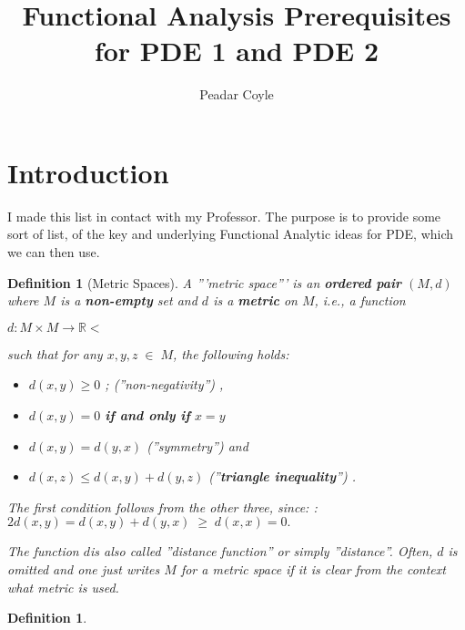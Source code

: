 \documentclass[a4paper,10pt]{article}
\title{Functional Analysis Prerequisites for PDE 1 and PDE 2}
\author{Peadar Coyle}
\theoremstyle{plain}
\newtheorem{definition}[theorem]{Definition}
\begin{document}
\maketitle
\begin{abstract}
 
\end{abstract}
\section{Introduction}
I made this list in contact with my Professor. 
The purpose is to provide some sort of list, of the key and underlying Functional Analytic ideas for PDE,
which we can then use.
\begin{definition}[Metric Spaces]
A '''metric space''' is an \textbf{ordered pair} $(M,d)$ where $M$ is a \textbf{non-empty}
 set and $d$ is a \textbf{metric} on $M$, i.e., a function

$d : M \times M \rightarrow \mathbb{R}<$

such that for any $x, y, z\; \in \;M$, the following holds:
\begin{itemize}
\item $d(x,y) \ge 0$     ; (''non-negativity'') ,
\item $d(x,y) = 0$ \textbf{if and only if} $x = y$ 
\item $d(x,y) = d(y,x)$      (''symmetry'') and
 \item $d(x,z) \le d(x,y) + d(y,z)$ (''\textbf{triangle inequality}'') .
\end{itemize}
The first condition follows from the other three, since:
: $2d(x,y) = d(x,y) + d(y,x)\; \ge\; d(x,x) = 0.$

The function $d$is also called ''distance function'' or simply ''distance''. 
Often, $d$ is omitted and one just writes 
$M$ for a metric space if it is clear from the context what metric is used.
 
\end{definition}
\cite{RudinFA}
\begin{definition}
 
\end{definition}



\end{document}
